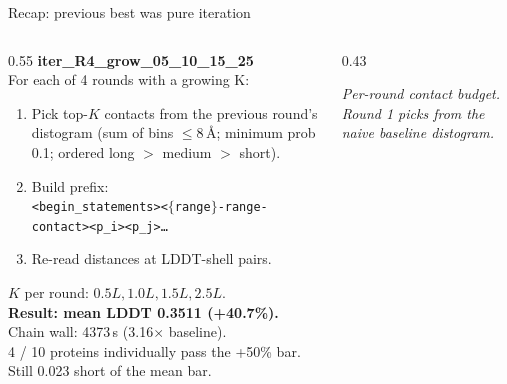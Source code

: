 \documentclass[aspectratio=169,11pt]{beamer}
\newcommand{\codeS}[1]{\texttt{\scriptsize\color{navy}#1}}
\begin{document}
\begin{frame}{Recap: previous best was pure iteration}
  \begin{columns}[T]
    \begin{column}{0.55\textwidth}
      \textbf{\ttfamily iter\_R4\_grow\_05\_10\_15\_25}\\[0.4em]
      For each of 4 rounds with a growing K:
      \begin{enumerate}
        \setlength\itemsep{0.15em}
        \item Pick top-$K$ contacts from the previous round's distogram
              (sum of bins $\leq 8$\,\r{A}; minimum prob 0.1; ordered
              long $>$ medium $>$ short).
        \item Build prefix:\\
              \codeS{<begin\_statements><$\{$range$\}$-range-contact><p\_i><p\_j>\ldots}
        \item Re-read distances at LDDT-shell pairs.
      \end{enumerate}
      \vspace{0.5em}
      $K$ per round: $0.5L, 1.0L, 1.5L, 2.5L$.
      \vspace{0.5em}\\
      \textbf{Result: mean LDDT 0.3511 (+40.7\%).}\\
      Chain wall: 4373\,s (3.16$\times$ baseline).\\[0.2em]
      4 / 10 proteins individually pass the +50\% bar.\\
      Still 0.023 short of the mean bar.
    \end{column}
    \begin{column}{0.43\textwidth}
      \begin{center}
      \end{center}
      \vspace{0.6em}
      {\footnotesize\color{grey}\itshape Per-round contact budget.
        Round 1 picks from the \emph{naive baseline} distogram.}
    \end{column}
  \end{columns}
\end{frame}
\end{document}
